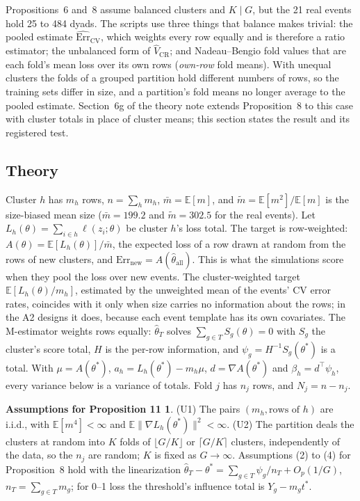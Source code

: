 \documentclass[11pt]{amsart}
\theoremstyle{plain}
\theoremstyle{definition}
\newtheorem*{assump11}{Assumptions for Proposition 11}
\theoremstyle{remark}
\newcommand{\E}{\mathbb{E}}
\newcommand{\CV}{\widehat{\mathrm{Err}}_{\mathrm{CV}}}
\newcommand{\Errnew}{\mathrm{Err}_{\mathrm{new}}}
\newcommand{\VCR}{\hat V_{\mathrm{CR}}}
\begin{document}
Propositions~6 and~8 assume balanced clusters and $K\mid G$, but the 21 real events hold 25 to 484 dyads. The scripts use three things that balance makes trivial: the pooled estimate $\CV$, which weights every row equally and is therefore a ratio estimator; the unbalanced form of $\VCR$; and Nadeau--Bengio fold values that are each fold's mean loss over its own rows (\emph{own-row} fold means). With unequal clusters the folds of a grouped partition hold different numbers of rows, so the training sets differ in size, and a partition's fold means no longer average to the pooled estimate. Section~6g of the theory note extends Proposition~8 to this case with cluster totals in place of cluster means; this section states the result and its registered test.

\subsection{Theory}
Cluster $h$ has $m_h$ rows, $n=\sum_hm_h$, $\bar m=\E[m]$, and $\tilde m=\E[m^2]/\E[m]$ is the size-biased mean size ($\bar m=199.2$ and $\tilde m=302.5$ for the real events). Let $L_h(\theta)=\sum_{i\in h}\ell(z_i;\theta)$ be cluster $h$'s loss total. The target is row-weighted: $A(\theta)=\E[L_h(\theta)]/\bar m$, the expected loss of a row drawn at random from the rows of new clusters, and $\Errnew=A(\hat\theta_{\mathrm{all}})$. This is what the simulations score when they pool the loss over new events. The cluster-weighted target $\E[L_h(\theta)/m_h]$, estimated by the unweighted mean of the events' CV error rates, coincides with it only when size carries no information about the rows; in the A2 designs it does, because each event template has its own covariates. The M-estimator weights rows equally: $\hat\theta_T$ solves $\sum_{g\in T}S_g(\theta)=0$ with $S_g$ the cluster's score total, $H$ is the per-row information, and $\psi_g=H^{-1}S_g(\theta^*)$ is a total. With $\mu=A(\theta^*)$, $a_h=L_h(\theta^*)-m_h\mu$, $d=\nabla A(\theta^*)$ and $\beta_h=d^\top\psi_h$, every variance below is a variance of totals. Fold $j$ has $n_j$ rows, and $N_j=n-n_j$.

\begin{assump11}
(U1) The pairs $(m_h,\text{rows of }h)$ are i.i.d., with $\E[m^4]<\infty$ and $\E\|\nabla L_h(\theta^*)\|^2<\infty$. (U2) The partition deals the clusters at random into $K$ folds of $\lfloor G/K\rfloor$ or $\lceil G/K\rceil$ clusters, independently of the data, so the $n_j$ are random; $K$ is fixed as $G\to\infty$. Assumptions (2) to (4) for Proposition~8 hold with the linearization $\hat\theta_T-\theta^*=\sum_{g\in T}\psi_g/n_T+O_p(1/G)$, $n_T=\sum_{g\in T}m_g$; for 0--1 loss the threshold's influence total is $Y_g-m_gt^*$.
\end{assump11}
\end{document}
